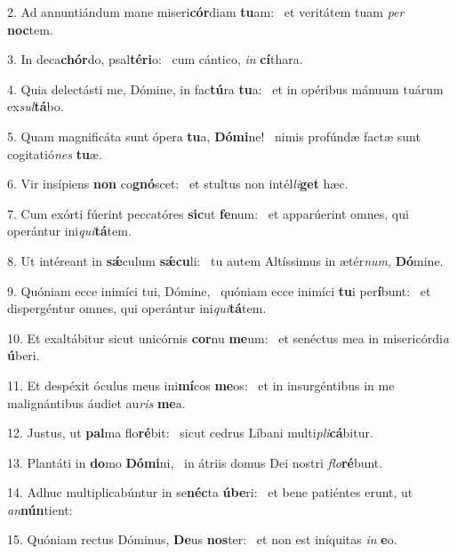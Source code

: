 2. Ad annuntiándum mane miseri\textbf{cór}diam \textbf{tu}am: \ast\  et veritátem tuam \textit{per} \textbf{noc}tem.\

3. In deca\textbf{chór}do, psal\textbf{té}\textbf{ri}o: \ast\  cum cántico, \textit{in} \textbf{cí}thara.\

4. Quia delectásti me, Dómine, in fac\textbf{tú}ra \textbf{tu}a: \ast\  et in opéribus mánuum tuárum ex\textit{sul}\textbf{tá}bo.\

5. Quam magnificáta sunt ópera \textbf{tu}a, \textbf{Dó}\textbf{mi}ne! \ast\  nimis profúndæ factæ sunt cogitatió\textit{nes} \textbf{tu}æ.\

6. Vir insípiens \textbf{non} co\textbf{gnó}scet: \ast\  et stultus non intél\textit{li}\textbf{get} hæc.\

7. Cum exórti fúerint peccatóres \textbf{sic}ut \textbf{fe}num: \ast\  et apparúerint omnes, qui operántur ini\textit{qui}\textbf{tá}tem.\

8. Ut intéreant in \textbf{sǽ}culum \textbf{sǽ}\textbf{cu}li: \ast\  tu autem Altíssimus in ætér\textit{num}, \textbf{Dó}mine.\

9. Quóniam ecce inimíci tui, Dómine, \dag\  quóniam ecce inimíci \textbf{tu}i per\textbf{í}bunt: \ast\  et dispergéntur omnes, qui operántur ini\textit{qui}\textbf{tá}tem.\

10. Et exaltábitur sicut unicórnis \textbf{cor}nu \textbf{me}um: \ast\  et senéctus mea in misericórdi\textit{a} \textbf{ú}beri.\

11. Et despéxit óculus meus ini\textbf{mí}cos \textbf{me}os: \ast\  et in insurgéntibus in me malignántibus áudiet au\textit{ris} \textbf{me}a.\

12. Justus, ut \textbf{pal}ma flo\textbf{ré}bit: \ast\  sicut cedrus Líbani multi\textit{pli}\textbf{cá}bitur.\

13. Plantáti in \textbf{do}mo \textbf{Dó}\textbf{mi}ni, \ast\  in átriis domus Dei nostri \textit{flo}\textbf{ré}bunt.\

14. Adhuc multiplicabúntur in se\textbf{néc}ta \textbf{ú}\textbf{be}ri: \ast\  et bene patiéntes erunt, ut \textit{an}\textbf{nún}tient:\

15. Quóniam rectus Dóminus, \textbf{De}us \textbf{nos}ter: \ast\  et non est iníquitas \textit{in} \textbf{e}o.\

